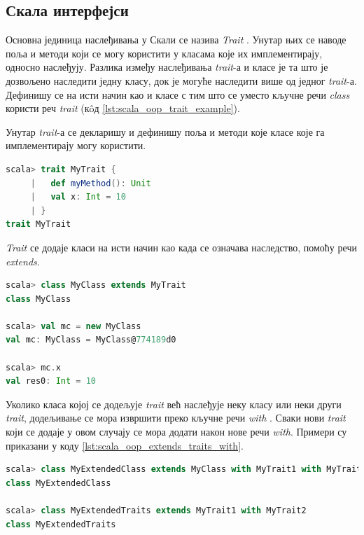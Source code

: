 \documentclass[12pt,oneside]{memoir}
\begin{document}
\subsection{Скала интерфејси}
\label{subsec:scala_traits}

Основна јединица наслеђивања у Скали се назива \textit{Trait} \cite{scala_prog}. Унутар њих се наводе поља и методи који се могу користити у класама које их имплементирају, односно наслеђују. Разлика између наслеђивања \textit{trait}-а и класе је та што је дозвољено наследити једну класу, док је могуће наследити више од једног \textit{trait}-а. Дефинишу се на исти начин као и класе с тим што се уместо кључне речи \textit{class} користи реч \textit{trait} (к\^{o}д \ref{lst:scala_oop_trait_example}).

Унутар \textit{trait}-а се декларишу и дефинишу поља и методи које класе које га имплементирају могу користити.

\begin{lstlisting}[language=Scala, caption={Скала \textit{trait}}, label={lst:scala_oop_trait_example}]
scala> trait MyTrait {
     |   def myMethod(): Unit
     |   val x: Int = 10
     | }
trait MyTrait
\end{lstlisting}

\noindent \textit{Trait} се додаје класи на исти начин као када се означава наследство, помоћу речи \textit{extends}. 

\begin{lstlisting}[language=Scala, caption={Додавање \textit{trait}-а класи}, label={lst:scala_oop_traits_extends_example}]
scala> class MyClass extends MyTrait
class MyClass

scala> val mc = new MyClass
val mc: MyClass = MyClass@774189d0

scala> mc.x
val res0: Int = 10
\end{lstlisting}

Уколико класа којој се додељује \textit{trait} већ наслеђује неку класу или неки други \textit{trait}, додељивање се мора извршити преко кључне речи \textit{with} \cite{scala_prog}. Сваки нови \textit{trait} који се додаје у овом случају се мора додати након нове речи \textit{with}. Примери су приказани у коду \ref{lst:scala_oop_extends_traits_with}.

\begin{lstlisting}[language=Scala, caption={Наслеђивање више \textit{trait}-ова}, label={lst:scala_oop_extends_traits_with}]
scala> class MyExtendedClass extends MyClass with MyTrait1 with MyTrait2
class MyExtendedClass

scala> class MyExtendedTraits extends MyTrait1 with MyTrait2
class MyExtendedTraits
\end{lstlisting}
\end{document}
